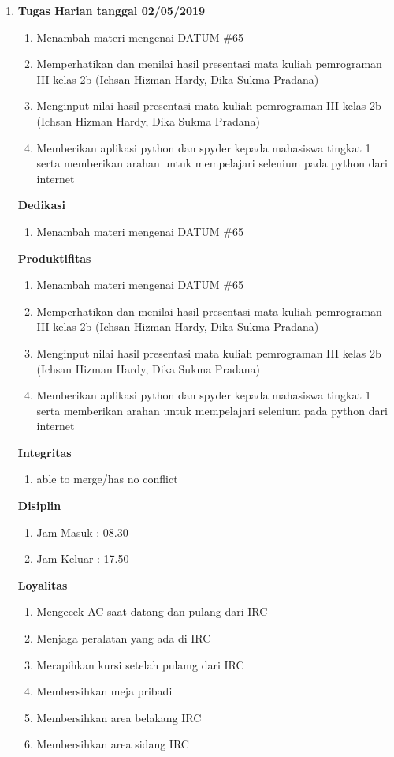 \begin{enumerate}
\item \textbf{Tugas Harian tanggal 02/05/2019}
\begin{enumerate}
\item Menambah materi mengenai DATUM \#65
\item Memperhatikan dan menilai hasil presentasi mata kuliah pemrograman III kelas 2b (Ichsan Hizman Hardy, Dika Sukma Pradana)
\item Menginput nilai hasil presentasi mata kuliah pemrograman III kelas 2b (Ichsan Hizman Hardy, Dika Sukma Pradana)
\item Memberikan aplikasi python dan spyder kepada mahasiswa tingkat 1 serta memberikan arahan untuk mempelajari selenium pada python dari internet
\end{enumerate}

\textbf{Dedikasi}
\begin{enumerate}
\item Menambah materi mengenai DATUM \#65
\end{enumerate}

\textbf{Produktifitas}
\begin{enumerate}
\item Menambah materi mengenai DATUM \#65
\item Memperhatikan dan menilai hasil presentasi mata kuliah pemrograman III kelas 2b (Ichsan Hizman Hardy, Dika Sukma Pradana)
\item Menginput nilai hasil presentasi mata kuliah pemrograman III kelas 2b (Ichsan Hizman Hardy, Dika Sukma Pradana)
\item Memberikan aplikasi python dan spyder kepada mahasiswa tingkat 1 serta memberikan arahan untuk mempelajari selenium pada python dari internet
\end{enumerate}

\textbf{Integritas}
\begin{enumerate}
\item able to merge/has no conflict
\end{enumerate}

\textbf{Disiplin}
\begin{enumerate}
\item Jam Masuk : 08.30
\item Jam Keluar : 17.50
\end{enumerate}

\textbf{Loyalitas}
\begin{enumerate}
\item Mengecek AC saat datang dan pulang dari IRC
\item Menjaga peralatan yang ada di IRC
\item Merapihkan kursi setelah pulamg dari IRC
\item Membersihkan meja pribadi
\item Membersihkan area belakang IRC
\item Membersihkan area sidang IRC
\end{enumerate}



\end{enumerate}
